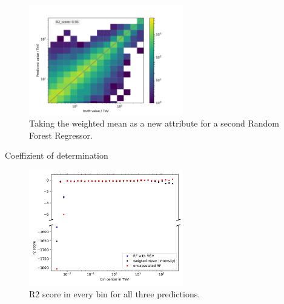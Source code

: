 \documentclass[aspectratio=1610, professionalfonts, 9pt]{beamer}
\begin{document}
  \begin{frame}
    \begin{figure}
      \centering
      \includegraphics[width=0.6\textwidth]{Plots/RF_MSV_encaps.pdf}
      \caption{Taking the weighted mean as a new attribute for a second Random Forest Regressor.}
    \end{figure}
  \end{frame}

  \begin{frame}{Coeffizient of determination}
    \begin{figure}
      \centering
      \includegraphics[width=0.6\textwidth]{Plots/RF_MSV_R2.pdf}
      \caption{R2 score in every bin for all three predictions.}
    \end{figure}
  \end{frame}
\end{document}
